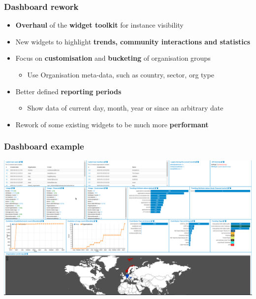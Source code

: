\begin{frame}
  \frametitle{Dashboard rework}
  \begin{itemize}
     \item {\bf Overhaul} of the {\bf widget toolkit} for instance visibility
     \item New widgets to highlight {\bf trends, community interactions and statistics}
     \item Focus on {\bf customisation} and {\bf bucketing} of organisation groups
     \begin{itemize}
         \item Use Organisation meta-data, such as country, sector, org type
     \end{itemize}
     \item Better defined {\bf reporting periods}
     \begin{itemize}
         \item Show data of current day, month, year or since an arbitrary date
     \end{itemize}
     \item Rework of some existing widgets to be much more {\bf performant}
  \end{itemize}
\end{frame}

\begin{frame}

\frametitle{Dashboard example}
\begin{center}
\includegraphics[scale=0.14]{images/dashboard_example.png}
\end{center}
\end{frame}

